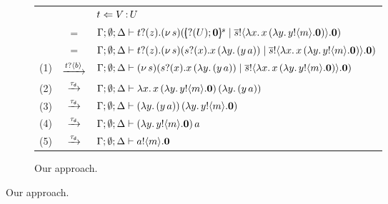 \begin{example}
	
%
%

\begin{figure}
\begin{subfigure}[t]{\textwidth}
	\begin{tabular}{rcl}
         &    &   $t \Leftarrow V{\,:\,}U$   
         \\[1mm]
		   &  $=$ & $\Gamma; \emptyset; \Delta \vdash t ? (z) . (\nu\, s)([\!\!(? (U) ; \mathbf{0})\!\!]^{s} \;|\; \overline{s} ! \langle \lambda x.\,x\, {(}\lambda y.\,y ! \langle m \rangle . \mathbf{0}) \rangle . \mathbf{0})$ 
		   \\[1mm]
		&  $=$& $\Gamma; \emptyset; \Delta \vdash t ? (z) . (\nu\, s)(s ? (x) . x\, {(\lambda y.\,(y\, {a}))} \;|\; \overline{s} ! \langle \lambda x.\,x\, {(}\lambda y.\,y ! \langle m \rangle . \mathbf{0}) \rangle . \mathbf{0})$
		 \\[1mm]
		(1)   &$\xrightarrow{t ? \langle b \rangle}$& $\Gamma; \emptyset; \Delta \vdash (\nu\, s)(s ? (x) . x\, {(\lambda y.\,(y\, {a}))} \;|\; \overline{s} ! \langle \lambda x.\,x\, {(}\lambda y.\,y ! \langle m \rangle . \mathbf{0}) \rangle . \mathbf{0})$\\
		(2)  &$\xrightarrow{\tau_{\mathsf{d}}}$& $\Gamma; \emptyset; \Delta \vdash \lambda x.\,x\, {(}\lambda y.\,y ! \langle m \rangle . \mathbf{0})\, {(\lambda y.\,(y\, {a}))}$\\
		(3)  &$\xrightarrow{\tau_{\mathsf{d}}}$& $\Gamma; \emptyset; \Delta \vdash (\lambda y.\,(y\, {a}))\, {(\lambda y.\,y ! \langle m \rangle . \mathbf{0})} $\\
		(4)   &$\xrightarrow{\tau_{\mathsf{d}}}$& $\Gamma; \emptyset; \Delta \vdash (\lambda y.\,y ! \langle m \rangle . \mathbf{0})\, {a}$\\
		(5)   &$\xrightarrow{\tau_{\mathsf{d}}}$& $\Gamma; \emptyset; \Delta \vdash a ! \langle m \rangle . \mathbf{0}$   %
	\end{tabular} 
	\caption{Our approach.}\label{tablejr:1}
	\end{subfigure}


\end{figure}
\end{example}
